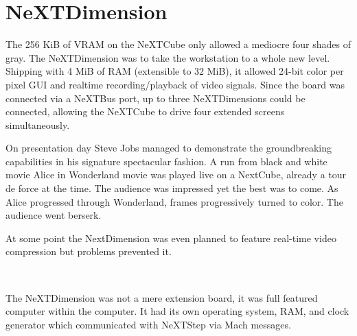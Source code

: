 \section{NeXTDimension}
The 256 KiB of VRAM on the NeXTCube only allowed a mediocre four shades of gray. The NeXTDimension was to take the workstation to a whole new level. Shipping with 4 MiB of RAM (extensible to 32 MiB), it allowed 24-bit color per pixel GUI and realtime recording/playback of video signals. Since the board was connected via a NeXTBus port, up to three NeXTDimensions could be connected, allowing the NeXTCube to drive four extended screens simultaneously.\\
\par
On presentation day Steve Jobs managed to demonstrate the groundbreaking capabilities in his signature spectacular fashion. A run from black and white movie Alice in Wonderland movie was played live on a NextCube, already a tour de force at the time. The audience was impressed yet the best was to come. As Alice progressed through Wonderland, frames progressively turned to color. The audience went berserk.\\
\par
At some point the NextDimension was even planned to feature real-time video compression but problems prevented it.\\
\par
{}\\
\par
The NeXTDimension was not a mere extension board, it was full featured computer within the computer. It had its own operating system, RAM, and clock generator which communicated with NeXTStep via Mach messages.\\
\par
{}
